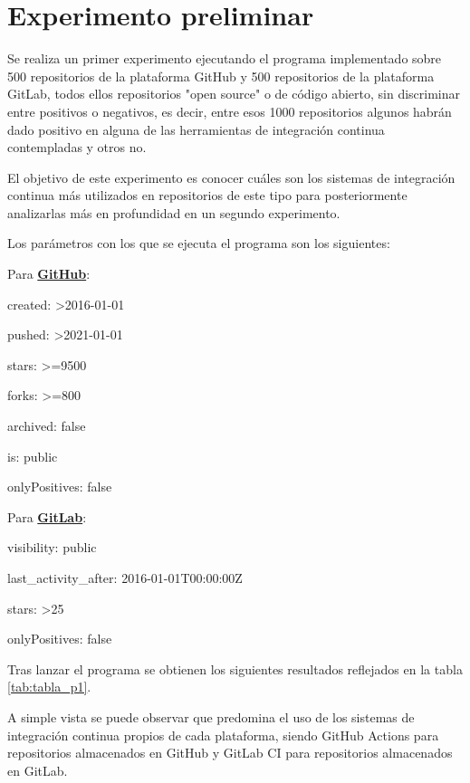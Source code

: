 \section{Experimento preliminar}
Se realiza un primer experimento ejecutando el programa implementado sobre 500 repositorios de la plataforma GitHub y 500 repositorios de la plataforma GitLab, todos ellos repositorios "open source" o de código abierto, sin discriminar entre positivos o negativos, es decir, entre esos 1000 repositorios algunos habrán dado positivo en alguna de las herramientas de integración continua contempladas y otros no.

El objetivo de este experimento es conocer cuáles son los sistemas de integración continua más utilizados en repositorios de este tipo para posteriormente analizarlas más en profundidad en un segundo experimento.

Los parámetros con los que se ejecuta el programa son los siguientes:
\begin{compactitem}
    \item Para \textbf{\underline{GitHub}}:
    \begin{compactitem}
        \item created: \textgreater2016-01-01
        \item pushed: \textgreater2021-01-01
        \item stars: \textgreater=9500
        \item forks: \textgreater=800
        \item archived: false
        \item is: public
        \item onlyPositives: false
    \end{compactitem}
    \item Para \textbf{\underline{GitLab}}:
    \begin{compactitem}
        \item visibility: public
        \item last\_activity\_after: 2016-01-01T00:00:00Z
        \item stars: \textgreater25
        \item onlyPositives: false
    \end{compactitem}
\end{compactitem}

Tras lanzar el programa se obtienen los siguientes resultados reflejados en la tabla \ref{tab:tabla_p1}.

A simple vista se puede observar que predomina el uso de los sistemas de integración continua propios de cada plataforma, siendo GitHub Actions para repositorios almacenados en GitHub y GitLab CI para repositorios almacenados en GitLab.

